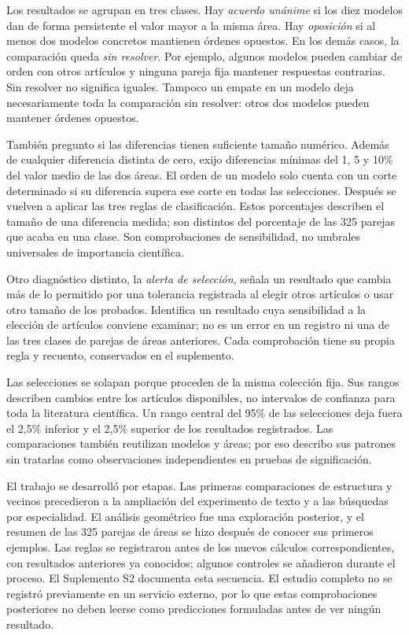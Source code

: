 \documentclass[12pt]{article}
\begin{document}
Los resultados se agrupan en tres clases. Hay \emph{acuerdo unánime} si los diez modelos dan de forma persistente el valor mayor a la misma área. Hay \emph{oposición} si al menos dos modelos concretos mantienen órdenes opuestos. En los demás casos, la comparación queda \emph{sin resolver}. Por ejemplo, algunos modelos pueden cambiar de orden con otros artículos y ninguna pareja fija mantener respuestas contrarias. Sin resolver no significa iguales. Tampoco un empate en un modelo deja necesariamente toda la comparación sin resolver: otros dos modelos pueden mantener órdenes opuestos.

También pregunto si las diferencias tienen suficiente tamaño numérico. Además de cualquier diferencia distinta de cero, exijo diferencias mínimas del 1, 5 y 10\% del valor medio de las dos áreas. El orden de un modelo solo cuenta con un corte determinado si su diferencia supera ese corte en todas las selecciones. Después se vuelven a aplicar las tres reglas de clasificación. Estos porcentajes describen el tamaño de una diferencia medida; son distintos del porcentaje de las 325 parejas que acaba en una clase. Son comprobaciones de sensibilidad, no umbrales universales de importancia científica.

Otro diagnóstico distinto, la \emph{alerta de selección}, señala un resultado que cambia más de lo permitido por una tolerancia registrada al elegir otros artículos o usar otro tamaño de los probados. Identifica un resultado cuya sensibilidad a la elección de artículos conviene examinar; no es un error en un registro ni una de las tres clases de parejas de áreas anteriores. Cada comprobación tiene su propia regla y recuento, conservados en el suplemento.

Las selecciones se solapan porque proceden de la misma colección fija. Sus rangos describen cambios entre los artículos disponibles, no intervalos de confianza para toda la literatura científica. Un rango central del 95\% de las selecciones deja fuera el 2,5\% inferior y el 2,5\% superior de los resultados registrados. Las comparaciones también reutilizan modelos y áreas; por eso describo sus patrones sin tratarlas como observaciones independientes en pruebas de significación.

El trabajo se desarrolló por etapas. Las primeras comparaciones de estructura y vecinos precedieron a la ampliación del experimento de texto y a las búsquedas por especialidad. El análisis geométrico fue una exploración posterior, y el resumen de las 325 parejas de áreas se hizo después de conocer sus primeros ejemplos. Las reglas se registraron antes de los nuevos cálculos correspondientes, con resultados anteriores ya conocidos; algunos controles se añadieron durante el proceso. El Suplemento S2 documenta esta secuencia. El estudio completo no se registró previamente en un servicio externo, por lo que estas comprobaciones posteriores no deben leerse como predicciones formuladas antes de ver ningún resultado.
\end{document}
